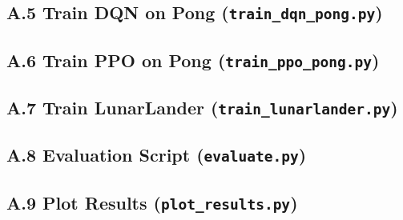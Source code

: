 \documentclass[12pt]{article}
\begin{document}
\subsection*{A.5 Train DQN on Pong (\texttt{train\_dqn\_pong.py})}


\subsection*{A.6 Train PPO on Pong (\texttt{train\_ppo\_pong.py})}


\subsection*{A.7 Train LunarLander (\texttt{train\_lunarlander.py})}


\subsection*{A.8 Evaluation Script (\texttt{evaluate.py})}


\subsection*{A.9 Plot Results (\texttt{plot\_results.py})}

\end{document}
